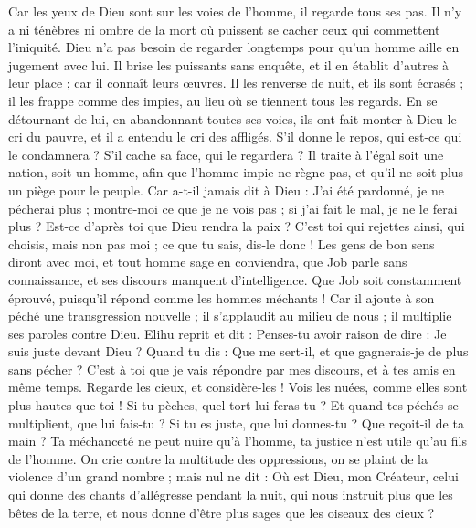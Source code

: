 \begin{multicols}{2}
Car les yeux de Dieu sont sur les voies de l'homme, il regarde tous ses pas.
Il n'y a ni ténèbres ni ombre de la mort où puissent se cacher ceux qui commettent l'iniquité.
Dieu n'a pas besoin de regarder longtemps pour qu'un homme aille en jugement avec lui.
Il brise les puissants sans enquête, et il en établit d'autres à leur place ;
car il connaît leurs œuvres. Il les renverse de nuit, et ils sont écrasés ;
il les frappe comme des impies, au lieu où se tiennent tous les regards.
En se détournant de lui, en abandonnant toutes ses voies,
ils ont fait monter à Dieu le cri du pauvre, et il a entendu le cri des affligés.
S'il donne le repos, qui est-ce qui le condamnera ? S'il cache sa face, qui le regardera ? Il traite à l'égal soit une nation, soit un homme,
afin que l'homme impie ne règne pas, et qu'il ne soit plus un piège pour le peuple.
Car a-t-il jamais dit à Dieu : J'ai été pardonné, je ne pécherai plus ;
montre-moi ce que je ne vois pas ; si j'ai fait le mal, je ne le ferai plus ?
Est-ce d'après toi que Dieu rendra la paix ? C'est toi qui rejettes ainsi, qui choisis, mais non pas moi ; ce que tu sais, dis-le donc !
Les gens de bon sens diront avec moi, et tout homme sage en conviendra,
que Job parle sans connaissance, et ses discours manquent d'intelligence.
Que Job soit constamment éprouvé, puisqu'il répond comme les hommes méchants !
Car il ajoute à son péché une transgression nouvelle ; il s'applaudit au milieu de nous ; il multiplie ses paroles contre Dieu.
\VerseOne{}Elihu reprit et dit :
Penses-tu avoir raison de dire : Je suis juste devant Dieu ?
Quand tu dis : Que me sert-il, et que gagnerais-je de plus sans pécher ?
C'est à toi que je vais répondre par mes discours, et à tes amis en même temps.
Regarde les cieux, et considère-les ! Vois les nuées, comme elles sont plus hautes que toi !
Si tu pèches, quel tort lui feras-tu ? Et quand tes péchés se multiplient, que lui fais-tu ?
Si tu es juste, que lui donnes-tu ? Que reçoit-il de ta main ?
Ta méchanceté ne peut nuire qu'à l'homme, ta justice n'est utile qu'au fils de l'homme.
On crie contre la multitude des oppressions, on se plaint de la violence d'un grand nombre ;
mais nul ne dit : Où est Dieu, mon Créateur, celui qui donne des chants d'allégresse pendant la nuit,
qui nous instruit plus que les bêtes de la terre, et nous donne d'être plus sages que les oiseaux des cieux ?

\end{multicols}
